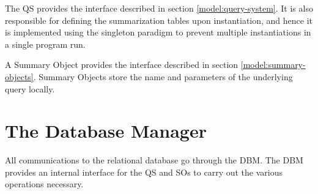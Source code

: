 The QS provides the interface described in section \ref{model:query-system}. It is also responsible for defining the summarization tables upon instantiation, and hence it is implemented using the singleton paradigm to prevent multiple instantiations in a single program run.

A Summary Object provides the interface described in section \ref{model:summary-objects}. Summary Objects store the name and parameters of the underlying query locally.

\section{The Database Manager}

All communications to the relational database go through the DBM. The DBM provides an internal interface for the QS and SOs to carry out the various operations necessary.

